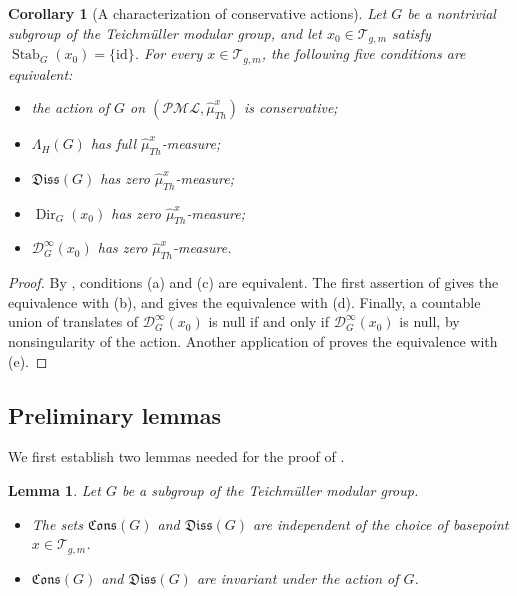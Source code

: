 \documentclass[dvipdfmx]{amsart}
\newtheorem{lemma}{Lemma}[section]
\newtheorem{corollary}{Corollary}[section]
\theoremstyle{remark}
\newcommand{\teich}{\mathcal{T}}
\newcommand{\PThursM}{\hat{\mu}_{Th}}
\newcommand{\pml}{\mathcal{PML}}
\newcommand{\Dirichlet}{\mathscr{D}}
\newcommand{\conservativepart}{\mathfrak{Cons}}
\newcommand{\dissipativepart}{\mathfrak{Diss}}
\begin{document}
\begin{corollary}[A characterization of conservative actions]
\label{coro:conservativity_Dirichletset}
Let $G$ be a nontrivial subgroup of the Teichm\"uller modular group, and let $x_0\in\teich_{g,m}$ satisfy $\operatorname{Stab}_G(x_0)=\{\mathrm{id}\}$. 
For every $x\in\teich_{g,m}$, the following five conditions are equivalent:
\begin{itemize}
\item[(a)] the action of $G$ on $(\pml,\PThursM^{x})$ is conservative;
\item[(b)] $\Lambda_H(G)$ has full $\PThursM^{x}$-measure;
\item[(c)] $\dissipativepart(G)$ has zero $\PThursM^{x}$-measure;
\item[(d)] $\operatorname{Dir}_G(x_0)$ has zero $\PThursM^{x}$-measure;
\item[(e)] $\Dirichlet^\infty_G(x_0)$ has zero $\PThursM^{x}$-measure.
\end{itemize}
\end{corollary}

\begin{proof}
By , conditions (a) and (c) are
equivalent. The first assertion of
 gives the equivalence with
(b), and  gives the equivalence with (d).
Finally, a countable union of translates of
$\Dirichlet^\infty_G(x_0)$ is null if and only if
$\Dirichlet^\infty_G(x_0)$ is null, by nonsingularity of the action.
Another application of  proves the
equivalence with (e).
\end{proof}

\subsection{Preliminary lemmas}
We first establish two lemmas needed for the proof of .
\begin{lemma}
\label{lem:Cons-Diss-ElementaryProperty}
Let $G$ be a subgroup of the Teichm\"uller modular group.
\begin{itemize}
\item[(a)]
The sets $\conservativepart(G)$ and $\dissipativepart(G)$ are independent of the choice of basepoint $x\in \teich_{g,m}$.
\item[(b)]
$\conservativepart(G)$ and $\dissipativepart(G)$ are invariant under
the action of $G$.
\end{itemize}
\end{lemma}
\end{document}
